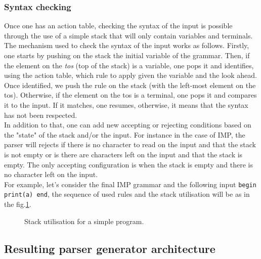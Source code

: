 \documentclass[a4paper,11pt]{article}
\begin{document}
    \subsubsection{Syntax checking}
      Once one has an action table, checking the syntax of the input is possible through the use of a simple stack that will only contain variables and terminals. The mechanism used to check the syntax of the input works as follows. Firstly, one starts by pushing on the stack the initial variable of the grammar. Then, if the element on the \textit{tos} (top of the stack) is a variable, one pops it and identifies, using the action table, which rule to apply given the variable and the look ahead. Once identified, we push the rule on the stack (with the left-most element on the tos). Otherwise, if the element on the tos is a terminal, one pops it and compares it to the input. If it matches, one resumes, otherwise, it means that the syntax has not been respected.\\
      In addition to that, one can add new accepting or rejecting conditions based on the "state" of the stack and/or the input. For instance in the case of IMP, the parser will rejects if there is no character to read on the input and that the stack is not empty or is there are characters left on the input and that the stack is empty. The only accepting configuration is when the stack is empty and there is no character left on the input.\\
      For example, let's consider the final IMP grammar and the following input \verb|begin print(a) end|, the sequence of used rules and the stack utilisation will be as in the fig.\ref{fig:simpleprogram}.
      \begin{figure}[h!]
        
        \caption{Stack utilisation for a simple program.}
        \label{fig:simpleprogram}
      \end{figure}
      
  \subsection{Resulting parser generator architecture}
  
\end{document}
